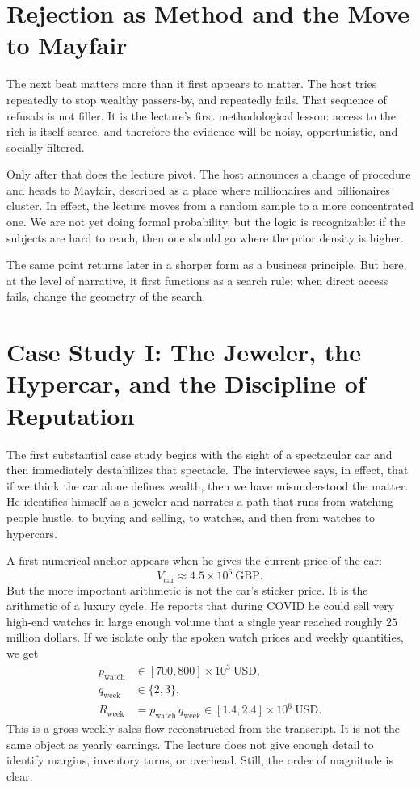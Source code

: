 \section{Rejection as Method and the Move to Mayfair}

The next beat matters more than it first appears to matter. The host tries repeatedly to stop wealthy passers-by, and repeatedly fails. That sequence of refusals is not filler. It is the lecture's first methodological lesson: access to the rich is itself scarce, and therefore the evidence will be noisy, opportunistic, and socially filtered.

Only after that does the lecture pivot. The host announces a change of procedure and heads to Mayfair, described as a place where millionaires and billionaires cluster. In effect, the lecture moves from a random sample to a more concentrated one. We are not yet doing formal probability, but the logic is recognizable: if the subjects are hard to reach, then one should go where the prior density is higher.

The same point returns later in a sharper form as a business principle. But here, at the level of narrative, it first functions as a search rule: when direct access fails, change the geometry of the search.

\section{Case Study I: The Jeweler, the Hypercar, and the Discipline of Reputation}

The first substantial case study begins with the sight of a spectacular car and then immediately destabilizes that spectacle. The interviewee says, in effect, that if we think the car alone defines wealth, then we have misunderstood the matter. He identifies himself as a jeweler and narrates a path that runs from watching people hustle, to buying and selling, to watches, and then from watches to hypercars.

A first numerical anchor appears when he gives the current price of the car:
\begin{equation}
V_{\mathrm{car}} \approx 4.5\times 10^{6}\ \mathrm{GBP}.
\end{equation}
But the more important arithmetic is not the car's sticker price. It is the arithmetic of a luxury cycle. He reports that during COVID he could sell very high-end watches in large enough volume that a single year reached roughly \(25\) million dollars. If we isolate only the spoken watch prices and weekly quantities, we get
\begin{align}
p_{\mathrm{watch}} &\in [700,800]\times 10^{3}\ \mathrm{USD},\\
q_{\mathrm{week}} &\in \{2,3\},\\
R_{\mathrm{week}} &= p_{\mathrm{watch}}\,q_{\mathrm{week}}
\in [1.4,2.4]\times 10^{6}\ \mathrm{USD}.
\end{align}
This is a gross weekly sales flow reconstructed from the transcript. It is not the same object as yearly earnings. The lecture does not give enough detail to identify margins, inventory turns, or overhead. Still, the order of magnitude is clear.


